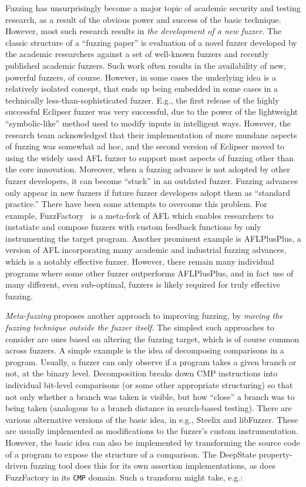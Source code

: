 \documentclass[numbers]{proposalnsf}
\begin{document}
Fuzzing has unsurprisingly become a major topic of academic security and testing research, as a result of the obvious power and success of the basic technique.  However, most such research results in \emph{the development of a new fuzzer.}  The classic structure of a ``fuzzing paper'' is evaluation of a novel fuzzer developed by the academic researchers against a set of well-known fuzzers and recently published academic fuzzers.  Such work often results in the availability of new, powerful fuzzers, of course.  However, in some cases the underlying idea is a relatively isolated concept, that ends up being embedded in some cases in a technically less-than-sophisticated fuzzer.  E.g., the first release of the highly successful Eclipser fuzzer was very successful, due to the power of the lightweight ``symbolic-like'' method used to modify inputs in intelligent ways.  However, the research team acknowledged that their implementation of more mundane aspects of fuzzing was somewhat ad hoc, and the second version of Eclipser moved to using the widely used AFL fuzzer to support most aspects of fuzzing other than the core innovation.  Moreover, when a fuzzing advance is not adopted by other fuzzer developers, it can become ``stuck'' in an outdated fuzzer.  Fuzzing advances only appear in new fuzzers if future fuzzer developers adopt them as ``standard practice.''  There have been some attempts to overcome this problem. For example, FuzzFactory~\cite{fuzzfactory} is a meta-fork of AFL which enables researchers to instatiate and compose fuzzers with custom feedback functions by only instrumenting the target program. Another prominent example is AFLPlusPlus, a version of AFL incorporating many academic and industrial fuzzing advances, which is a notably effective fuzzer.  However, there remain many individual programs where some other fuzzer outperforms AFLPlusPlus, and in fact use of many different, even sub-optimal, fuzzers is likely required for truly effective fuzzing.

\emph{Meta-fuzzing} proposes another approach to improving fuzzing, by \emph{moving the fuzzing technique outside the fuzzer itself.}  The simplest such approaches to consider are ones based on altering the fuzzing target, which is of course common across fuzzers.  A simple example is the idea of decomposing comparisons in a program.  Usually, a fuzzer can only observe if a program takes a given branch or not, at the binary level.  Decomposition breaks down CMP instructions into individual bit-level comparisons (or some other appropriate structuring) so that not only whether a branch was taken is visible, but how ``close'' a branch was to being taken (analogous to a branch distance in search-based testing).  There are various alternative versions of the basic idea, in e.g., Steelix and libFuzzer.  These are usually implemented as modifications to the fuzzer's custom instrumentation.  However, the basic idea can also be implemented by transforming the source code of a program to expose the structure of a comparison.  The DeepState property-driven fuzzing tool does this for its own assertion implementations, as does FuzzFactory in its \texttt{CMP} domain.  Such a transform might take, e.g.:
\end{document}
